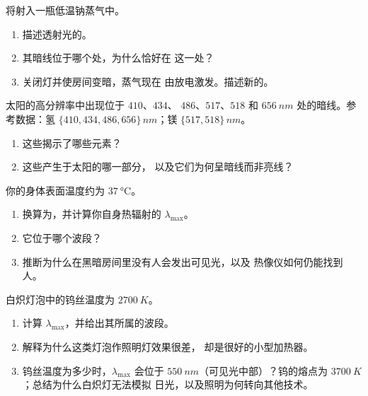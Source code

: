 \begin{exercise}[$\star\star$]\label{exo:g10:light-spectra:9}
将射入一瓶低温钠蒸气中。
\begin{enumerate}
  \item 描述透射光的。
  \item 其暗线位于哪个处，为什么恰好在
        这一处？
  \item 关闭灯并使房间变暗，蒸气现在
        由放电激发。描述新的。
\end{enumerate}
\end{exercise}

\begin{exercise}[$\star\star$]\label{exo:g10:light-spectra:10}
太阳的高分辨率中出现位于 $410$、$434$、
$486$、$517$、$518$ 和 $\qty{656}{nm}$ 处的暗线。参考数据：氢
$\{410, 434, 486, 656\}\,\unit{nm}$；镁 $\{517, 518\}\,\unit{nm}$。
\begin{enumerate}
  \item 这些揭示了哪些元素？
  \item 这些产生于太阳的哪一部分，
        以及它们为何呈暗线而非亮线？
\end{enumerate}
\end{exercise}

\begin{exercise}[$\star\star$]\label{exo:g10:light-spectra:11}
你的身体表面温度约为 $\qty{37}{\degreeCelsius}$。
\begin{enumerate}
  \item 换算为，并计算你自身热辐射的
        $\lambda_{\max}$。
  \item 它位于哪个波段？
  \item 推断为什么在黑暗房间里没有人会发出可见光，以及
        热像仪如何仍能找到人。
\end{enumerate}
\end{exercise}

\begin{exercise}[$\star\star\star$]\label{exo:g10:light-spectra:12}
白炽灯泡中的钨丝温度为 $\qty{2700}{K}$。
\begin{enumerate}
  \item 计算 $\lambda_{\max}$，并给出其所属的波段。
  \item 解释为什么这类灯泡作照明灯效果很差，
        却是很好的小型加热器。
  \item 钨丝温度为多少时，$\lambda_{\max}$ 会位于
        $\qty{550}{nm}$（可见光中部）？钨的熔点为
        $\qty{3700}{K}$；总结为什么白炽灯无法模拟
        日光，以及照明为何转向其他技术。
\end{enumerate}
\end{exercise}


